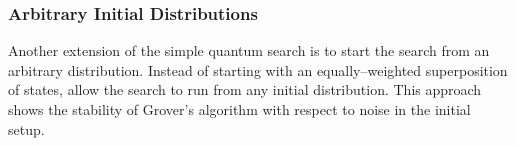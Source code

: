 \subsubsection{Arbitrary Initial Distributions}

Another extension of the simple quantum search is to start the search
from an arbitrary distribution.
Instead of starting with an 
equally--weighted superposition of states, allow the search to run from any
initial distribution.  This approach shows the stability of 
Grover's algorithm with respect to noise in the initial 
setup\cite{Biham/Biham/Biron/Grassl/Lidar:98}.  


%
